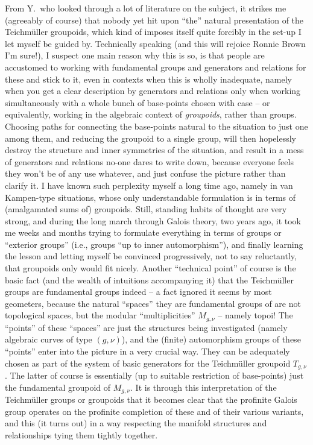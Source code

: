 From Y.\ who looked through a lot of literature on the subject, it
strikes me (agreeably of course) that nobody yet hit upon ``the''
natural presentation of the Teichmüller groupoids, which kind of
imposes itself quite forcibly in the set-up I let myself be guided
by. Technically speaking (and this will rejoice Ronnie Brown I'm
sure!), I suspect one main reason why this is so, is that people are
accustomed to working with fundamental groups and generators and
relations for these and stick to it, even in contexts when this is
wholly inadequate, namely when you get a clear description
by generators and relations only when working simultaneously with a
whole bunch of base-points chosen with case -- or equivalently,
working in the algebraic context of \emph{groupoids}, rather than
groups. Choosing paths for connecting the base-points natural to the
situation to just one among them, and reducing the groupoid to a
single group, will then hopelessly destroy the structure and inner
symmetries of the situation, and result in a mess of generators and
relations no-one dares to write down, because everyone feels they
won't be of any use whatever, and just confuse the picture rather than
clarify it. I have known such perplexity myself a long time ago,
namely in van Kampen-type situations, whose only understandable
formulation is in terms of (amalgamated sums of) groupoids. Still,
standing habits of thought are very strong, and during the long march
through Galois theory, two years ago, it took me weeks and months
trying to formulate everything in terms of groups or ``exterior
groups'' (i.e., groups ``up to inner automorphism''), and finally
learning the lesson and letting myself be convinced progressively, not
to say reluctantly, that groupoids only would fit nicely. Another
``technical point'' of course is the basic fact (and the wealth of
intuitions accompanying it) that the Teichmüller groups are
fundamental groups indeed -- a fact ignored it seems by most
geometers, because the natural ``spaces'' they are fundamental groups
of are not topological spaces, but the modular ``multiplicities''
$M_{g,\nu}$ -- namely topoi! The ``points'' of these ``spaces'' are
just the structures being investigated (namely algebraic curves of
type $(g,\nu)$), and the (finite) automorphism groups of these
``points'' enter into the picture in a very crucial way. They can be
adequately chosen as part of the system of basic generators for the
Teichmüller groupoid $T_{g,\nu}$. The latter of course is essentially
(up to suitable restriction of base-points) just the fundamental
groupoid of $M_{g,\nu}$. It is through this interpretation of the
Teichmüller groups or groupoids that it becomes clear that the
profinite Galois group \GalQQ{} operates on the profinite completion
of these and of their various variants, and this (it turns out) in a
way respecting the manifold structures and relationships tying them
tightly together.

